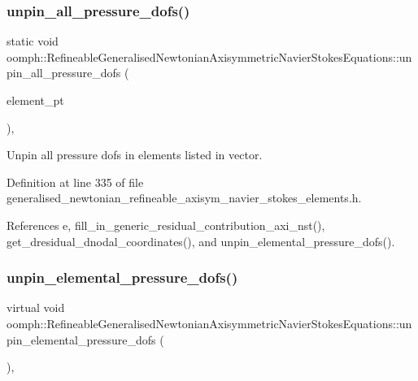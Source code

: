 \subsubsection{\texorpdfstring{unpin\+\_\+all\+\_\+pressure\+\_\+dofs()}{unpin\_all\_pressure\_dofs()}}
{\footnotesize\ttfamily static void oomph\+::\+Refineable\+Generalised\+Newtonian\+Axisymmetric\+Navier\+Stokes\+Equations\+::unpin\+\_\+all\+\_\+pressure\+\_\+dofs (\begin{DoxyParamCaption}\item[{const \hyperlink{classoomph_1_1Vector}{Vector}$<$ \hyperlink{classoomph_1_1GeneralisedElement}{Generalised\+Element} $\ast$$>$ \&}]{element\+\_\+pt }\end{DoxyParamCaption})\hspace{0.3cm}{\ttfamily [inline]}, {\ttfamily [static]}}



Unpin all pressure dofs in elements listed in vector. 



Definition at line 335 of file generalised\+\_\+newtonian\+\_\+refineable\+\_\+axisym\+\_\+navier\+\_\+stokes\+\_\+elements.\+h.



References e, fill\+\_\+in\+\_\+generic\+\_\+residual\+\_\+contribution\+\_\+axi\+\_\+nst(), get\+\_\+dresidual\+\_\+dnodal\+\_\+coordinates(), and unpin\+\_\+elemental\+\_\+pressure\+\_\+dofs().

\mbox{\label{classoomph_1_1RefineableGeneralisedNewtonianAxisymmetricNavierStokesEquations_adec2514256f89cd8ff2694abd8178675}} 
\subsubsection{\texorpdfstring{unpin\+\_\+elemental\+\_\+pressure\+\_\+dofs()}{unpin\_elemental\_pressure\_dofs()}}
{\footnotesize\ttfamily virtual void oomph\+::\+Refineable\+Generalised\+Newtonian\+Axisymmetric\+Navier\+Stokes\+Equations\+::unpin\+\_\+elemental\+\_\+pressure\+\_\+dofs (\begin{DoxyParamCaption}{ }\end{DoxyParamCaption})\hspace{0.3cm}{\ttfamily [protected]}, {}}




